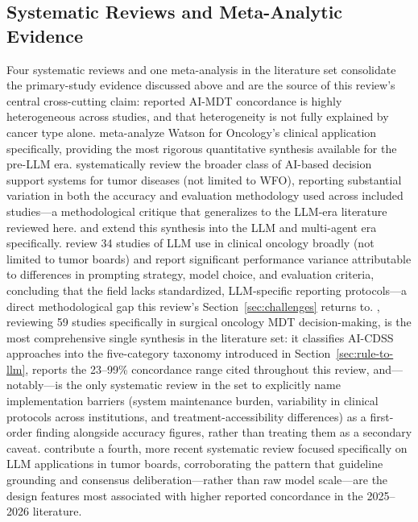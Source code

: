\documentclass[acmsmall,screen=true,review=false,nonacm=true]{acmart}
\begin{document}
\subsection{Systematic Reviews and Meta-Analytic Evidence}
\label{sec:systematic}

Four systematic reviews and one meta-analysis in the literature set consolidate the primary-study evidence discussed above and are the source of this review's central cross-cutting claim: reported AI-MDT concordance is highly heterogeneous across studies, and that heterogeneity is not fully explained by cancer type alone. \citet{jie2021} meta-analyze Watson for Oncology's clinical application specifically, providing the most rigorous quantitative synthesis available for the pre-LLM era. \citet{oehring2023} systematically review the broader class of AI-based decision support systems for tumor diseases (not limited to WFO), reporting substantial variation in both the accuracy and evaluation methodology used across included studies---a methodological critique that generalizes to the LLM-era literature reviewed here. \citet{carl2024} and \citet{wu2026} extend this synthesis into the LLM and multi-agent era specifically. \citet{carl2024} review 34 studies of LLM use in clinical oncology broadly (not limited to tumor boards) and report significant performance variance attributable to differences in prompting strategy, model choice, and evaluation criteria, concluding that the field lacks standardized, LLM-specific reporting protocols---a direct methodological gap this review's Section~\ref{sec:challenges} returns to. \citet{wu2026}, reviewing 59 studies specifically in surgical oncology MDT decision-making, is the most comprehensive single synthesis in the literature set: it classifies AI-CDSS approaches into the five-category taxonomy introduced in Section~\ref{sec:rule-to-llm}, reports the 23--99\% concordance range cited throughout this review, and---notably---is the only systematic review in the set to explicitly name implementation barriers (system maintenance burden, variability in clinical protocols across institutions, and treatment-accessibility differences) as a first-order finding alongside accuracy figures, rather than treating them as a secondary caveat. \citet{konzmann2026} contribute a fourth, more recent systematic review focused specifically on LLM applications in tumor boards, corroborating the pattern that guideline grounding and consensus deliberation---rather than raw model scale---are the design features most associated with higher reported concordance in the 2025--2026 literature.
\end{document}
